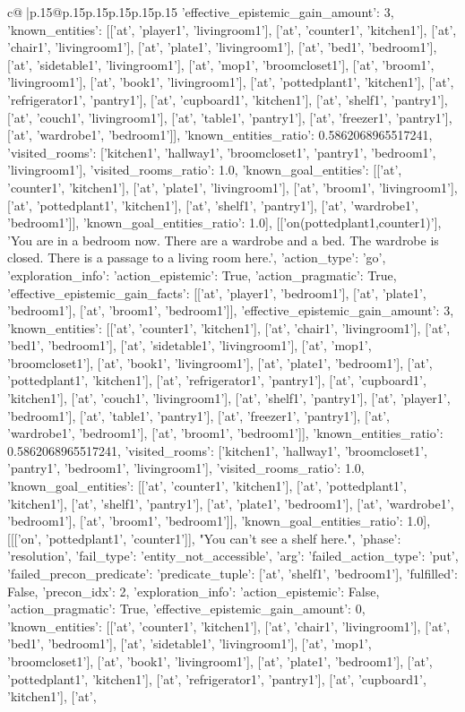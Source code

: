 \documentclass{article}
\begin{document}
{\begin{supertabular}{c@{$\;$}|p{.15\linewidth}@{}p{.15\linewidth}p{.15\linewidth}p{.15\linewidth}p{.15\linewidth}p{.15\linewidth}}
{{{'effective_epistemic_gain_amount': 3, 'known_entities': [['at', 'player1', 'livingroom1'], ['at', 'counter1', 'kitchen1'], ['at', 'chair1', 'livingroom1'], ['at', 'plate1', 'livingroom1'], ['at', 'bed1', 'bedroom1'], ['at', 'sidetable1', 'livingroom1'], ['at', 'mop1', 'broomcloset1'], ['at', 'broom1', 'livingroom1'], ['at', 'book1', 'livingroom1'], ['at', 'pottedplant1', 'kitchen1'], ['at', 'refrigerator1', 'pantry1'], ['at', 'cupboard1', 'kitchen1'], ['at', 'shelf1', 'pantry1'], ['at', 'couch1', 'livingroom1'], ['at', 'table1', 'pantry1'], ['at', 'freezer1', 'pantry1'], ['at', 'wardrobe1', 'bedroom1']], 'known_entities_ratio': 0.5862068965517241, 'visited_rooms': ['kitchen1', 'hallway1', 'broomcloset1', 'pantry1', 'bedroom1', 'livingroom1'], 'visited_rooms_ratio': 1.0, 'known_goal_entities': [['at', 'counter1', 'kitchen1'], ['at', 'plate1', 'livingroom1'], ['at', 'broom1', 'livingroom1'], ['at', 'pottedplant1', 'kitchen1'], ['at', 'shelf1', 'pantry1'], ['at', 'wardrobe1', 'bedroom1']], 'known_goal_entities_ratio': 1.0}}], [['on(pottedplant1,counter1)'], 'You are in a bedroom now. There are a wardrobe and a bed. The wardrobe is closed. There is a passage to a living room here.', {'action_type': 'go', 'exploration_info': {'action_epistemic': True, 'action_pragmatic': True, 'effective_epistemic_gain_facts': [['at', 'player1', 'bedroom1'], ['at', 'plate1', 'bedroom1'], ['at', 'broom1', 'bedroom1']], 'effective_epistemic_gain_amount': 3, 'known_entities': [['at', 'counter1', 'kitchen1'], ['at', 'chair1', 'livingroom1'], ['at', 'bed1', 'bedroom1'], ['at', 'sidetable1', 'livingroom1'], ['at', 'mop1', 'broomcloset1'], ['at', 'book1', 'livingroom1'], ['at', 'plate1', 'bedroom1'], ['at', 'pottedplant1', 'kitchen1'], ['at', 'refrigerator1', 'pantry1'], ['at', 'cupboard1', 'kitchen1'], ['at', 'couch1', 'livingroom1'], ['at', 'shelf1', 'pantry1'], ['at', 'player1', 'bedroom1'], ['at', 'table1', 'pantry1'], ['at', 'freezer1', 'pantry1'], ['at', 'wardrobe1', 'bedroom1'], ['at', 'broom1', 'bedroom1']], 'known_entities_ratio': 0.5862068965517241, 'visited_rooms': ['kitchen1', 'hallway1', 'broomcloset1', 'pantry1', 'bedroom1', 'livingroom1'], 'visited_rooms_ratio': 1.0, 'known_goal_entities': [['at', 'counter1', 'kitchen1'], ['at', 'pottedplant1', 'kitchen1'], ['at', 'shelf1', 'pantry1'], ['at', 'plate1', 'bedroom1'], ['at', 'wardrobe1', 'bedroom1'], ['at', 'broom1', 'bedroom1']], 'known_goal_entities_ratio': 1.0}}], [[['on', 'pottedplant1', 'counter1']], "You can't see a shelf here.", {'phase': 'resolution', 'fail_type': 'entity_not_accessible', 'arg': {'failed_action_type': 'put', 'failed_precon_predicate': {'predicate_tuple': ['at', 'shelf1', 'bedroom1'], 'fulfilled': False, 'precon_idx': 2}}, 'exploration_info': {'action_epistemic': False, 'action_pragmatic': True, 'effective_epistemic_gain_amount': 0, 'known_entities': [['at', 'counter1', 'kitchen1'], ['at', 'chair1', 'livingroom1'], ['at', 'bed1', 'bedroom1'], ['at', 'sidetable1', 'livingroom1'], ['at', 'mop1', 'broomcloset1'], ['at', 'book1', 'livingroom1'], ['at', 'plate1', 'bedroom1'], ['at', 'pottedplant1', 'kitchen1'], ['at', 'refrigerator1', 'pantry1'], ['at', 'cupboard1', 'kitchen1'], ['at', }}}
\end{supertabular}}
\end{document}
